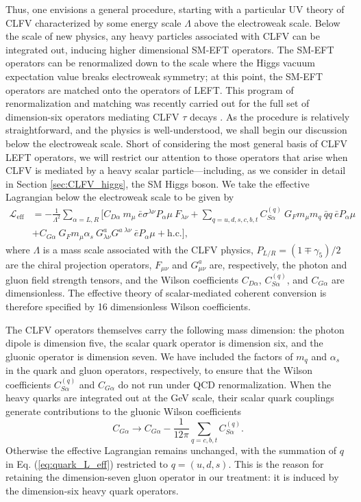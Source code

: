 \documentclass[12pt,letterpaper]{book}
\begin{document}
Thus, one envisions a general procedure, starting with a particular UV theory of CLFV characterized by some energy scale $\Lambda$ above the electroweak scale. Below the scale of new physics, any heavy particles associated with CLFV can be integrated out, inducing higher dimensional SM-EFT operators. The SM-EFT operators can be renormalized down to the scale where the Higgs vacuum expectation value breaks electroweak symmetry; at this point, the SM-EFT operators are matched onto the operators of LEFT. This program of renormalization and matching was recently carried out for the full set of dimension-six operators mediating CLFV $\tau$ decays \cite{Cirigliano:2021img}. As the procedure is relatively straightforward, and the physics is well-understood, we shall begin our discussion below the electroweak scale. Short of considering the most general basis of CLFV LEFT operators, we will restrict our attention to those operators that arise when CLFV is mediated by a heavy scalar particle---including, as we consider in detail in Section \ref{sec:CLFV_higgs}, the SM Higgs boson. We take the effective Lagrangian below the electroweak scale to be given by
\begin{equation}
\begin{split}
\mathcal{L}_\mathrm{eff}&=-\frac{1}{\Lambda^2}\sum_{\alpha=L,R}\bigg[C_{D\alpha}~m_{\mu}~\bar{e}\sigma^{\lambda\nu}P_{\alpha}\mu~F_{\lambda\nu}+\sum_{q=u,d,s,c,b,t}C^{(q)}_{S\alpha}~G_Fm_{\mu}m_q~\bar{q}q~\bar{e}P_{\alpha}\mu\\
&+C_{G\alpha}~G_Fm_{\mu}\alpha_s~G^a_{\lambda\nu}G^{a\;\lambda\nu}~\bar{e}P_{\alpha}\mu+\mathrm{h.c.}\bigg],
\label{eq:quark_L_eff}
\end{split}
\end{equation}
where $\Lambda$ is a mass scale associated with the CLFV physics, $P_{L/R}=\left(1\mp \gamma_5\right)/2$ are the chiral projection operators, $F_{\mu\nu}$ and $G^a_{\mu\nu}$ are, respectively, the photon and gluon field strength tensors, and the Wilson coefficients $C_{D\alpha}$, $C_{S\alpha}^{(q)}$, and $C_{G\alpha}$ are dimensionless. The effective theory of scalar-mediated coherent conversion is therefore specified by 16 dimensionless Wilson coefficients. 

The CLFV operators themselves carry the following mass dimension: the photon dipole is dimension five, the scalar quark operator is dimension six, and the gluonic operator is dimension seven. We have included the factors of $m_q$ and $\alpha_s$ in the quark and gluon operators, respectively, to ensure that the Wilson coefficients $C_{S\alpha}^{(q)}$ and $C_{G\alpha}$ do not run under QCD renormalization. When the heavy quarks are integrated out at the GeV scale, their scalar quark couplings generate contributions to the gluonic Wilson coefficients
\begin{equation}
C_{G\alpha}\rightarrow C_{G\alpha}-\frac{1}{12\pi}\sum_{q=c,b,t}C^{(q)}_{S\alpha}.
\end{equation}
Otherwise the effective Lagrangian remains unchanged, with the summation of $q$ in Eq. (\ref{eq:quark_L_eff}) restricted to $q=(u,d,s)$. This is the reason for retaining the dimension-seven gluon operator in our treatment: it is induced by the dimension-six heavy quark operators.
\end{document}

